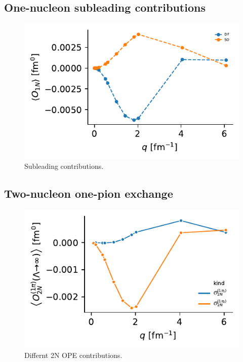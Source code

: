 \documentclass[onecolumn]{revtex4-2}
\begin{document}
\subsection{One-nucleon subleading contributions}
\begin{figure}[htb!]
    \includegraphics{figs/1n-nlo.pdf}
    \caption{Subleading contributions.}
    \label{}
\end{figure}

\subsection{Two-nucleon one-pion exchange}
\begin{figure}[htb!]
    \includegraphics{figs/2n-ope.pdf}
    \caption{Differnt 2N OPE contributions.}
    \label{}
\end{figure}
\end{document}
